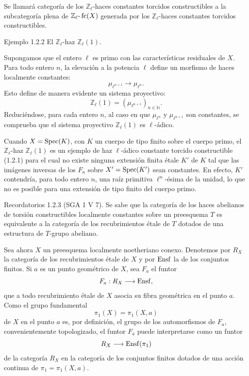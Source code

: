 Se llamará categoría de los \(\mathbb Z_\ell\)-haces constantes torcidos constructibles a la subcategoría plena de \(\mathbb Z_\ell\text{-}\operatorname{fc}(X)\) generada por los \(\mathbb Z_\ell\)-haces constantes torcidos constructibles.

\begin{statement}{Ejemplo 1.2.2}
El \(\mathbb Z_\ell\)-haz \(\mathbb Z_\ell(1)\).
\end{statement}

Supongamos que el entero \(\ell\) es primo con las características residuales de \(X\). Para todo entero \(n\), la elevación a la potencia \(\ell\) define un morfismo de haces localmente constantes:
\[
\mu_{\ell^{n+1}}\longrightarrow \mu_{\ell^n}.
\]
Esto define de manera evidente un sistema proyectivo:
\[
\mathbb Z_\ell(1)=(\mu_{\ell^{n+1}})_{n\in\mathbb N}.
\]
Reduciéndose, para cada entero \(n\), al caso en que \(\mu_{\ell^n}\) y \(\mu_{\ell^{n+1}}\) son constantes, se comprueba que el sistema proyectivo \(\mathbb Z_\ell(1)\) es \(\ell\)-ádico.

Cuando \(X=\operatorname{Spec}(K)\), con \(K\) un cuerpo de tipo finito sobre el cuerpo primo, el \(\mathbb Z_\ell\)-haz \(\mathbb Z_\ell(1)\) es un ejemplo de haz \(\ell\)-ádico constante torcido constructible (1.2.1) para el cual no existe ninguna extensión finita étale \(K'\) de \(K\) tal que las imágenes inversas de los \(F_n\) sobre \(X'=\operatorname{Spec}(K')\) sean constantes. En efecto, \(K'\) contendría, para todo entero \(n\), una raíz primitiva \(\ell^n\)-ésima de la unidad, lo que no es posible para una extensión de tipo finito del cuerpo primo.

\begin{statement}{Recordatorios 1.2.3}
(SGA 1 V 7). Se sabe que la categoría de los haces abelianos de torsión constructibles localmente constantes sobre un preesquema \(T\) es equivalente a la categoría de los recubrimientos étale de \(T\) dotados de una estructura de \(T\)-grupo abeliano.
\end{statement}

Sea ahora \(X\) un preesquema localmente noetheriano conexo. Denotemos por \(R_X\) la categoría de los recubrimientos étale de \(X\) y por \(\operatorname{Ensf}\) la de los conjuntos finitos. Si \(a\) es un punto geométrico de \(X\), sea \(F_a\) el funtor
\[
F_a:R_X\longrightarrow \operatorname{Ensf},
\]
que a todo recubrimiento étale de \(X\) asocia su fibra geométrica en el punto \(a\). Como el grupo fundamental
\[
\pi_1(X)=\pi_1(X,a)
\]
de \(X\) en el punto \(a\) es, por definición, el grupo de los automorfismos de \(F_a\), convenientemente topologizado, el funtor \(F_a\) puede interpretarse como un funtor
\[
R_X\longrightarrow \operatorname{Ensf}(\pi_1)
\]
de la categoría \(R_X\) en la categoría de los conjuntos finitos dotados de una acción continua de \(\pi_1=\pi_1(X,a)\).

